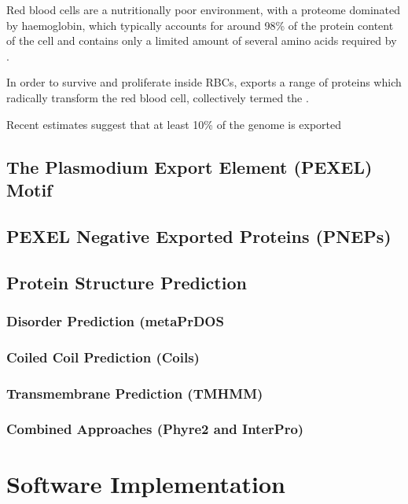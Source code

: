 \documentclass[fleqn,10pt]{SelfArx} %
\begin{document}
Red blood cells are a nutritionally poor environment, with a proteome dominated by haemoglobin, which typically accounts for around 98\% of the protein content of the cell \cite{DAlessandro2010} and contains only a limited amount of several amino acids required by \pf. 

In order to survive and proliferate inside RBCs, \pf exports a range of proteins which radically transform the red blood cell, collectively termed the .

Recent estimates suggest that at least 10\% of the \pf genome is exported \cite{Boddey2013a}  


\subsection*{The Plasmodium Export Element (PEXEL) Motif}
\subsection*{PEXEL Negative Exported Proteins (PNEPs)}
\subsection{Protein Structure Prediction}

\subsubsection*{Disorder Prediction (metaPrDOS}

\subsubsection*{Coiled Coil Prediction (Coils)}

\subsubsection*{Transmembrane Prediction (TMHMM)}

\subsubsection*{Combined Approaches (Phyre2 and InterPro)}


\section{Software Implementation}
\end{document}
